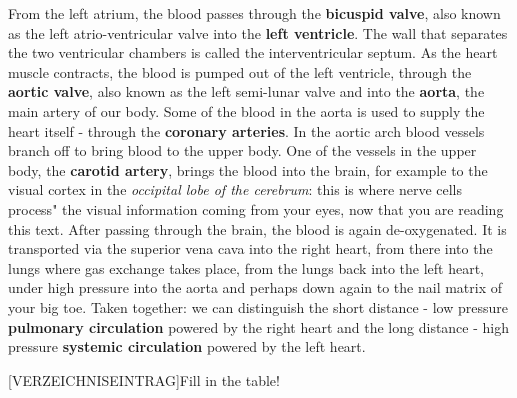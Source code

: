 From the left atrium, the blood passes through the \textbf{bicuspid valve}, also known as the left atrio-ventricular valve into the \textbf{left ventricle}. The wall that separates the two ventricular chambers is called the interventricular septum. As the heart muscle contracts, the blood is pumped out of the left ventricle, through the \textbf{aortic valve}, also known as the left semi-lunar valve and into the \textbf{aorta}, the main artery of our body. Some of the blood in the aorta is used to supply the heart itself - through the \textbf{coronary arteries}. In the aortic arch blood vessels branch off to bring blood to the upper body. One of the vessels in the upper body, the \textbf{carotid artery}, brings the blood into the brain, for example to the visual cortex in the \emph{occipital lobe of the cerebrum}: this is where nerve cells process" the visual information coming from your eyes, now that you are reading this text. After passing through the brain, the blood is again de-oxygenated. It is transported via the superior vena cava into the right heart, from there into the lungs where gas exchange takes place, from the lungs back into the left heart, under high pressure into the aorta and perhaps down again to the nail matrix of your big toe. Taken together: we can distinguish the short distance - low pressure \textbf{pulmonary circulation} powered by the right heart and the long distance - high pressure \textbf{systemic circulation} powered by the left heart.



	\vspace{4pt}
	\begin{minipage}[htbp]{1\columnwidth}
	 [VERZEICHNISEINTRAG]{Fill in the table!}  	\label{fig:BILDLABEL}
	\vspace{2pt}
	\end{minipage}

	\clearpage
